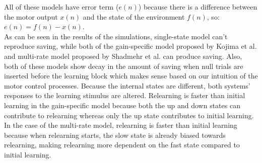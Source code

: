 \documentclass[9pt,twocolumn]{paper-template}
\begin{document}
All of these models have error term ($e(n)$) because there is a difference between the motor output $x(n)$ and the state of the environment $f(n)$, so: $e(n) = f (n) - x(n)$.\\
As can be seen in the results of the simulations, single-state model can't reproduce saving, while both of the gain-specific model proposed by Kojima et al. and multi-rate model proposed by Shadmehr et al. can produce saving. Also, both of these models show decay in the amount of saving when null trials are inserted before the learning block which makes sense based on our intuition of the motor control processes. Because the internal states are different, both systems’ responses to the learning stimulus are altered. Relearning is faster than initial learning in the gain-specific model because both the up and down states can contribute to relearning whereas only the up state contributes to initial learning. In the case of the multi-rate model, relearning is faster than initial learning because when relearning starts, the
slow state is already biased towards relearning, making relearning more dependent on the fast state compared to initial learning.\\
\end{document}
